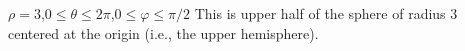 {$\rho=3$,\quad $0\leq \theta\leq2\pi$,\quad $0\leq\varphi\leq \pi/2$
}
{This is upper half of the sphere of radius 3 centered at the origin (i.e., the upper hemisphere).
}
